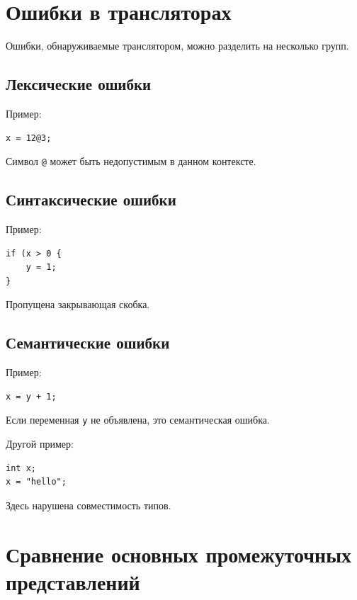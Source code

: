 \documentclass[12pt,a4paper]{article}
\begin{document}
\section{Ошибки в трансляторах}

Ошибки, обнаруживаемые транслятором, можно разделить на несколько групп.

\subsection{Лексические ошибки}

Пример:

\begin{lstlisting}
x = 12@3;
\end{lstlisting}

Символ \texttt{@} может быть недопустимым в данном контексте.

\subsection{Синтаксические ошибки}

Пример:

\begin{lstlisting}
if (x > 0 {
    y = 1;
}
\end{lstlisting}

Пропущена закрывающая скобка.

\subsection{Семантические ошибки}

Пример:

\begin{lstlisting}
x = y + 1;
\end{lstlisting}

Если переменная \texttt{y} не объявлена, это семантическая ошибка.

Другой пример:

\begin{lstlisting}
int x;
x = "hello";
\end{lstlisting}

Здесь нарушена совместимость типов.

\section{Сравнение основных промежуточных представлений}
\end{document}
